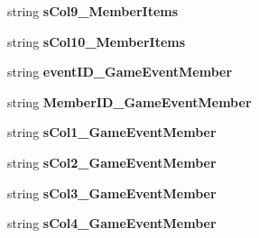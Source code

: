 \begin{DoxyCompactItemize}
\item 
string {\bfseries s\+Col9\+\_\+\+Member\+Items}\hypertarget{a00110_ace039e77be8c7fd8617034c178a8f474}{}\label{a00110_ace039e77be8c7fd8617034c178a8f474}

\item 
string {\bfseries s\+Col10\+\_\+\+Member\+Items}\hypertarget{a00110_a95a52cc2d621d328b7a8572473fd425a}{}\label{a00110_a95a52cc2d621d328b7a8572473fd425a}

\item 
string {\bfseries event\+I\+D\+\_\+\+Game\+Event\+Member}\hypertarget{a00110_a406b5f5a30ca83078938f1836b8a5924}{}\label{a00110_a406b5f5a30ca83078938f1836b8a5924}

\item 
string {\bfseries Member\+I\+D\+\_\+\+Game\+Event\+Member}\hypertarget{a00110_a4903769bcf7445d41433d6ff2e620c98}{}\label{a00110_a4903769bcf7445d41433d6ff2e620c98}

\item 
string {\bfseries s\+Col1\+\_\+\+Game\+Event\+Member}\hypertarget{a00110_ae3781f6699c56c73aed4a5f84ba92c4b}{}\label{a00110_ae3781f6699c56c73aed4a5f84ba92c4b}

\item 
string {\bfseries s\+Col2\+\_\+\+Game\+Event\+Member}\hypertarget{a00110_ab52b8465a47ced167a3607fb8395fcd2}{}\label{a00110_ab52b8465a47ced167a3607fb8395fcd2}

\item 
string {\bfseries s\+Col3\+\_\+\+Game\+Event\+Member}\hypertarget{a00110_a0accfc584d2cc08ebfd67d3b37d99c2b}{}\label{a00110_a0accfc584d2cc08ebfd67d3b37d99c2b}

\item 
string {\bfseries s\+Col4\+\_\+\+Game\+Event\+Member}\hypertarget{a00110_a188563b03abdcf102aa2fa96e3919e7c}{}\label{a00110_a188563b03abdcf102aa2fa96e3919e7c}


\end{DoxyCompactItemize}
